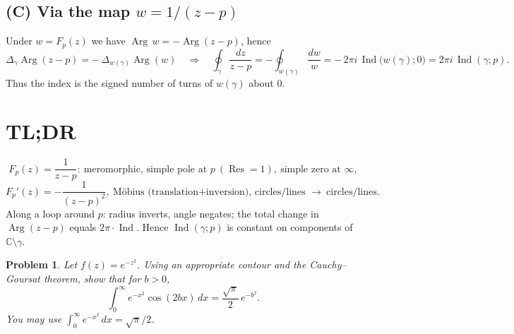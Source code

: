 \documentclass[11pt]{article}
\DeclareMathOperator{\Res}{Res}
\newcommand{\C}{\mathbb{C}}
\DeclareMathOperator{\Ind}{Ind}
\DeclareMathOperator{\Arg}{Arg}
\newtheorem{problem}{Problem}
\begin{document}
\subsection*{(C) Via the map \(w=1/(z-p)\)}
Under $w=F_p(z)$ we have $\Arg\,w=-\Arg(z-p)$, hence
\[
\Delta_{\gamma}\Arg(z-p)=-\,\Delta_{w(\gamma)}\Arg(w)
\quad\Rightarrow\quad
\oint_{\gamma}\frac{dz}{z-p}=-\oint_{w(\gamma)}\frac{dw}{w}
=-\,2\pi i\,\Ind\big(w(\gamma);0\big)
=2\pi i\,\Ind(\gamma;p).
\]
Thus the index is the signed number of turns of $w(\gamma)$ about $0$.

\section*{TL;DR}
\[
F_p(z)=\frac{1}{z-p}:\ \text{meromorphic, simple pole at }p\ (\Res=1),\ \text{simple zero at }\infty,
\]
\[
F_p'(z)=-\frac{1}{(z-p)^2},\ \text{Möbius (translation+inversion), circles/lines }\to\ \text{circles/lines}.
\]
Along a loop around $p$: radius inverts, angle negates; the total change in $\Arg(z-p)$ equals $2\pi\cdot\Ind$.
Hence $\Ind(\gamma;p)$ is constant on components of $\C\setminus\gamma$.


\begin{problem}
	Let $f(z)=e^{-z^{2}}$. Using an appropriate contour and the Cauchy--Goursat theorem, show that for $b>0$,
	\[
	\int_{0}^{\infty} e^{-x^{2}}\cos(2bx)\,dx=\frac{\sqrt{\pi}}{2}\,e^{-b^{2}}.
	\]
	You may use $\int_{0}^{\infty} e^{-x^{2}}\,dx=\sqrt{\pi}/2$.
\end{problem}
\end{document}

